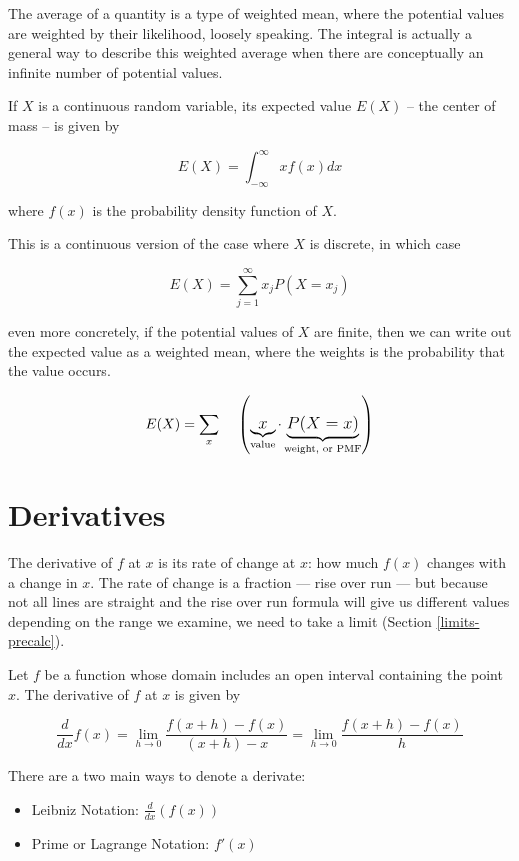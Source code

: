 \documentclass[]{book}
\providecommand{\tightlist}{%
  \setlength{\itemsep}{0pt}\setlength{\parskip}{0pt}}
\theoremstyle{definition}
\theoremstyle{definition}
\theoremstyle{definition}
\theoremstyle{remark}
\let\BeginKnitrBlock\begin \let\EndKnitrBlock\end
\begin{document}
The average of a quantity is a type of weighted mean, where the
potential values are weighted by their likelihood, loosely speaking. The
integral is actually a general way to describe this weighted average
when there are conceptually an infinite number of potential values.

If \(X\) is a continuous random variable, its expected value \(E(X)\) --
the center of mass -- is given by

\[E(X) = \int^{\infty}_{-\infty}x f(x) dx\]

where \(f(x)\) is the probability density function of \(X\).

This is a continuous version of the case where \(X\) is discrete, in
which case

\[E(X) = \sum^\infty_{j=1} x_j P(X = x_j)\]

even more concretely, if the potential values of \(X\) are finite, then
we can write out the expected value as a weighted mean, where the
weights is the probability that the value occurs.

\[E(X) = \large \sum_{x} \quad\left( \underbrace{x}_{\text{value}}\cdot \underbrace{P(X = x)}_{\text{weight, or PMF}}\right)\]

\section{Derivatives}\label{derivintro}

The derivative of \(f\) at \(x\) is its rate of change at \(x\): how
much \(f(x)\) changes with a change in \(x\). The rate of change is a
fraction --- rise over run --- but because not all lines are straight
and the rise over run formula will give us different values depending on
the range we examine, we need to take a limit (Section
\ref{limits-precalc}).

\BeginKnitrBlock{definition}[Derivative]
\protect\hypertarget{def:unnamed-chunk-15}{}{\label{def:unnamed-chunk-15}
{} }Let \(f\) be a function whose domain
includes an open interval containing the point \(x\). The derivative of
\(f\) at \(x\) is given by

\[\frac{d}{dx}f(x) =\lim\limits_{h\to 0} \frac{f(x+h)-f(x)}{(x+h)-x} = \lim\limits_{h\to 0} \frac{f(x+h)-f(x)}{h}
\]

There are a two main ways to denote a derivate:

\begin{itemize}
\tightlist
\item
  Leibniz Notation: \(\frac{d}{dx}(f(x))\)
\item
  Prime or Lagrange Notation: \(f'(x)\)
\end{itemize}
\EndKnitrBlock{definition}
\end{document}
